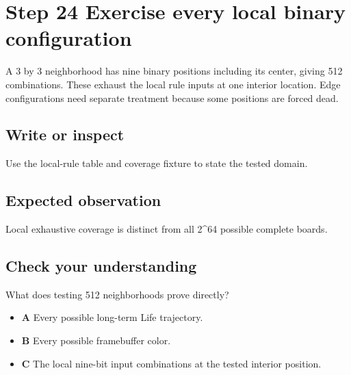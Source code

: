 \section{Step 24 Exercise every local binary
  configuration}\label{008-life-generations-s24-step-24-exercise-every-local-binary-configuration}

A 3 by 3 neighborhood has nine binary positions including its center,
giving 512 combinations. These exhaust the local rule inputs at one
interior location. Edge configurations need separate treatment because
some positions are forced dead.

\subsection{Write or
  inspect}\label{008-life-generations-s24-write-or-inspect}

Use the local-rule table and coverage fixture to state the tested
domain.

\subsection{Expected
  observation}\label{008-life-generations-s24-expected-observation}

Local exhaustive coverage is distinct from all 2\^{}64 possible complete
boards.

\subsection{Check your
  understanding}\label{008-life-generations-s24-check-your-understanding}

What does testing 512 neighborhoods prove directly?

\begin{itemize}
  \tightlist
  \item
        \textbf{A} Every possible long-term Life trajectory.
  \item
        \textbf{B} Every possible framebuffer color.
  \item
        \textbf{C} The local nine-bit input combinations at the tested
        interior position.
\end{itemize}
